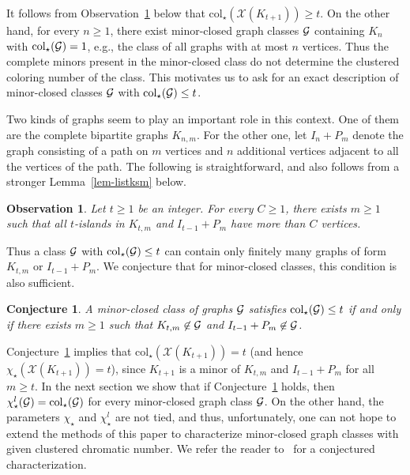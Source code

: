 \documentclass[12pt]{article}
\newcommand{\GG}{{\cal G}}
\newtheorem{conj}[theorem]{Conjecture}
\newtheorem{observation}[theorem]{Observation}
\newcommand{\col}{\text{col}}
\newcommand{\mc}[1]{\mathcal{#1}}
\begin{document}
It follows from Observation~\ref{obs-basgr} below that 
$\col_\star(\mc{X}(K_{t+1})) \geq t$.  On the other hand, for every $n\ge 1$,
there exist minor-closed graph classes $\GG$ containing $K_n$ with $\col_\star(\GG)=1$, e.g., the class of all graphs with at most $n$
vertices.  Thus the complete minors present in the minor-closed class do not determine the clustered coloring number of the class. This motivates us to ask for an exact description of minor-closed classes $\GG$ with $\col_\star(\GG)\le t$.

Two kinds of graphs seem to play an important role in this context.  One of them are the complete bipartite graphs $K_{n,m}$.
For the other one, let $I_n+P_m$ denote the graph consisting of a path on $m$ vertices and $n$ additional vertices adjacent to all the vertices of the path.
The following is straightforward, and also follows from a stronger Lemma~\ref{lem-listksm} below.

\begin{observation}\label{obs-basgr}
Let $t\ge 1$ be an integer.  For every $C\ge 1$, there exists $m\ge 1$ such that all $t$-islands in $K_{t,m}$ and $I_{t-1}+P_m$
have more than $C$ vertices.
\end{observation}

Thus a class $\GG$ with $\col_\star(\GG)\le t$ can contain only finitely many graphs of form $K_{t,m}$ or $I_{t-1}+P_m$.  We conjecture
that for minor-closed classes, this condition is also sufficient.

\begin{conj}\label{conj-chara}
A minor-closed class of graphs $\GG$ satisfies $\col_\star(\GG)\le t$ if and only if there exists $m\ge 1$ such that
$K_{t,m}\not\in \GG$ and $I_{t-1}+P_m\not\in\GG$.
\end{conj}

Conjecture~\ref{conj-chara} implies that $\col_\star(\mc{X}(K_{t+1}))=t$ (and hence $\chi_\star(\mc{X}(K_{t+1})) = t$), since $K_{t+1}$ 
is a minor of $K_{t,m}$ and $I_{t-1}+P_m$ for all $m\ge t$. In the next section we show that if Conjecture~\ref{conj-chara} holds, then $\chi^l_\star(\GG)=\col_\star(\GG)$
for every minor-closed graph class $\GG$. On the other hand, the parameters $\chi_\star$ and $\chi^l_\star$ are not tied, and thus, unfortunately, one can not hope to extend
the methods of this paper to characterize minor-closed graph classes with given clustered chromatic number. We refer the reader to~\cite[Conjectures 30 and 32]{NSSW17} for a conjectured characterization.
\end{document}
